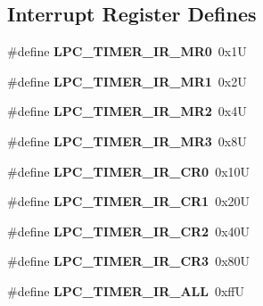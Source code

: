 \subsection*{Interrupt Register Defines}
\begin{DoxyCompactItemize}
\item 
\mbox{\label{group__lpc__timer_gaecae6e0171a10e4a8693cc2fdac72db9}} 
\#define {\bfseries L\+P\+C\+\_\+\+T\+I\+M\+E\+R\+\_\+\+I\+R\+\_\+\+M\+R0}~0x1U
\item 
\mbox{\label{group__lpc__timer_ga0b919e444ba97ac61853901361261b32}} 
\#define {\bfseries L\+P\+C\+\_\+\+T\+I\+M\+E\+R\+\_\+\+I\+R\+\_\+\+M\+R1}~0x2U
\item 
\mbox{\label{group__lpc__timer_gaa7d1c98cf2565490aa6acba71e57d1d8}} 
\#define {\bfseries L\+P\+C\+\_\+\+T\+I\+M\+E\+R\+\_\+\+I\+R\+\_\+\+M\+R2}~0x4U
\item 
\mbox{\label{group__lpc__timer_gaa124711c847e7f37a35ffa865fe19c78}} 
\#define {\bfseries L\+P\+C\+\_\+\+T\+I\+M\+E\+R\+\_\+\+I\+R\+\_\+\+M\+R3}~0x8U
\item 
\mbox{\label{group__lpc__timer_ga17c43b949bba2bcae9e05452a4fdad38}} 
\#define {\bfseries L\+P\+C\+\_\+\+T\+I\+M\+E\+R\+\_\+\+I\+R\+\_\+\+C\+R0}~0x10U
\item 
\mbox{\label{group__lpc__timer_ga4a8173301e23b00cc1d1d6872f9b324d}} 
\#define {\bfseries L\+P\+C\+\_\+\+T\+I\+M\+E\+R\+\_\+\+I\+R\+\_\+\+C\+R1}~0x20U
\item 
\mbox{\label{group__lpc__timer_ga04b50f4849342083a653e6f15c675012}} 
\#define {\bfseries L\+P\+C\+\_\+\+T\+I\+M\+E\+R\+\_\+\+I\+R\+\_\+\+C\+R2}~0x40U
\item 
\mbox{\label{group__lpc__timer_gaba288f587946d4fa36b21a775c8c4de6}} 
\#define {\bfseries L\+P\+C\+\_\+\+T\+I\+M\+E\+R\+\_\+\+I\+R\+\_\+\+C\+R3}~0x80U
\item 
\mbox{\label{group__lpc__timer_ga1ad80a2645e287fcd6357842f7b3ab3e}} 
\#define {\bfseries L\+P\+C\+\_\+\+T\+I\+M\+E\+R\+\_\+\+I\+R\+\_\+\+A\+LL}~0xffU
\end{DoxyCompactItemize}
